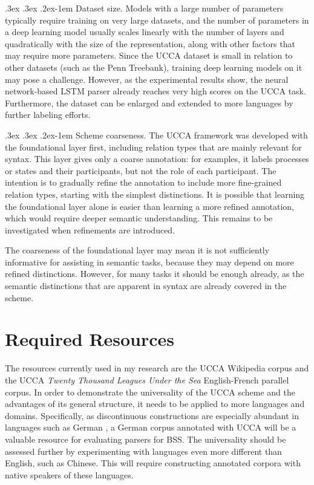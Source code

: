 \documentclass[12pt]{article}
\makeatletter
\renewcommand{\paragraph}{
  \@startsection{paragraph}{4}
  {\z@}{.3ex \@plus .3ex \@minus .2ex}{-1em}
  {\normalfont\normalsize\bfseries}
}
\makeatother
\begin{document}
\paragraph{Dataset size.}
Models with a large number of parameters typically require training on very
large datasets, and the number of parameters in a deep learning model usually
scales linearly with the number of layers and quadratically with the size of
the representation, along with other factors that may require more parameters.
Since the UCCA dataset is small in relation to other datasets (such as the Penn
Treebank), training deep learning models on it may pose a challenge.
However, as the experimental results show, the neural network-based LSTM parser
already reaches very high scores on the UCCA task.
Furthermore, the dataset can be enlarged and extended to more languages by further
labeling efforts.


\paragraph{Scheme coarseness.}
The UCCA framework was developed with the foundational layer first, including
relation types that are mainly relevant for syntax. This layer gives only a
coarse annotation: for examples, it labels processes or states and their
participants, but not the role of each participant. The intention is to
gradually refine the annotation to include more fine-grained relation types,
starting with the simplest distinctions. It is possible that learning
the foundational layer alone is easier than learning a more
refined annotation, which would require deeper semantic understanding.
This remains to be investigated when refinements are introduced.

The coarseness of the foundational layer may mean it is not
sufficiently informative for assisting in semantic tasks, because they may
depend on more refined distinctions. However, for many tasks it should be
enough already, as the semantic distinctions that are apparent in syntax are
already covered in the scheme.

\section{Required Resources}\label{sec:resources}

The resources currently used in my research are the
UCCA Wikipedia corpus and the
UCCA \textit{Twenty Thousand Leagues Under the Sea} English-French parallel corpus.
In order to demonstrate the universality of the UCCA scheme and the advantages of its general structure,
it needs to be applied to more languages and domains.
Specifically, as discontinuous constructions are especially abundant in languages such as German
\cite{maier2015discontinuous}, a German corpus annotated with UCCA will be a valuable resource for evaluating
parsers for BSS.
The universality should be assessed further by experimenting with languages even more different than English,
such as Chinese. This will require constructing annotated corpora with native speakers of these languages.
\end{document}
